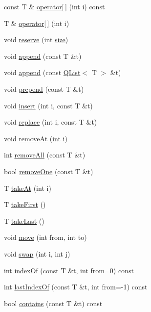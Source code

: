 \begin{DoxyCompactItemize}
const T \& \hyperlink{class_q_list_ac143057ba0fa5934e704e5ff638339d4}{operator\mbox{[}$\,$\mbox{]}} (int i) const 
\item 
T \& \hyperlink{class_q_list_aaa62d7f41e6fc05dff4da8dba575bfe6}{operator\mbox{[}$\,$\mbox{]}} (int i)
\item 
void \hyperlink{class_q_list_aedf0849585d0ba83a3ca3cce25fcddb1}{reserve} (int \hyperlink{class_q_list_a2ee18cf0bec5e1d0951a1ca1ccfb93fe}{size})
\item 
void \hyperlink{class_q_list_a3a1e18c5fb9cc04324825a46540638c5}{append} (const T \&t)
\item 
void \hyperlink{class_q_list_a16e557469f7a3562adb43ebbd46354db}{append} (const \hyperlink{class_q_list}{Q\+List}$<$ T $>$ \&t)
\item 
void \hyperlink{class_q_list_a3d6003bfe5d2e7495df9dae2902743d0}{prepend} (const T \&t)
\item 
void \hyperlink{class_q_list_a2ae4b66fdb5875c4c55eb903fa5ca25b}{insert} (int i, const T \&t)
\item 
void \hyperlink{class_q_list_ab39c49b508cf66371cc536c2bc3fb544}{replace} (int i, const T \&t)
\item 
void \hyperlink{class_q_list_a318a24dd49568516ad82cc341fe1aada}{remove\+At} (int i)
\item 
int \hyperlink{class_q_list_af882739967540dbf2810411f997039de}{remove\+All} (const T \&t)
\item 
bool \hyperlink{class_q_list_a4d25954344152f81e20ec6171f1bbcbd}{remove\+One} (const T \&t)
\item 
T \hyperlink{class_q_list_a078f9ab0404fcfb8fcc0ee1b7c6699c4}{take\+At} (int i)
\item 
T \hyperlink{class_q_list_a8059621f8145f7b79278f619c1bb0e47}{take\+First} ()
\item 
T \hyperlink{class_q_list_a410757ac0ab9febcda1541fa43adb98c}{take\+Last} ()
\item 
void \hyperlink{class_q_list_a19a4be38371f5a6b340b246a247b1f67}{move} (int from, int to)
\item 
void \hyperlink{class_q_list_ac9689c368581be3ad0ae047292c007fa}{swap} (int i, int j)
\item 
int \hyperlink{class_q_list_a1fa87bbf834812e0f400d8c14ab35b8a}{index\+Of} (const T \&t, int from=0) const 
\item 
int \hyperlink{class_q_list_aa0b792f98f9cf740bb6a8774572eac18}{last\+Index\+Of} (const T \&t, int from=-\/1) const 
\item 
bool \hyperlink{class_q_list_aedb4de9a920c63b531d2064bf0bee652}{contains} (const T \&t) const 

\end{DoxyCompactItemize}
